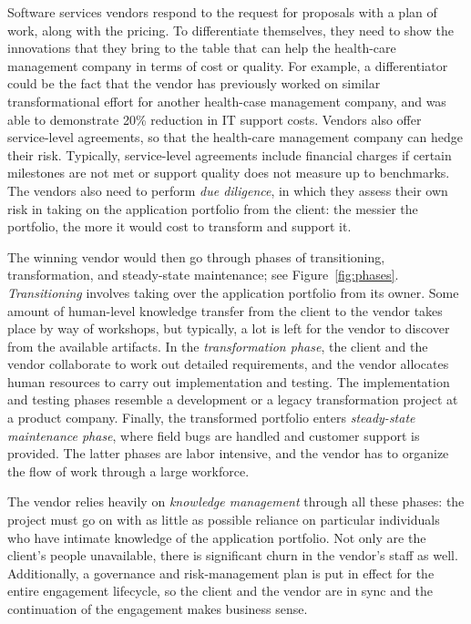 Software services vendors respond to the request for proposals with a plan of
work, along with the pricing. To differentiate themselves, they need to show the
innovations that they bring to the table that can help the health-care
management company in terms of cost or quality. For example, a differentiator
could be the fact that the vendor has previously worked on similar
transformational effort for another health-case management company, and was able
to demonstrate 20\% reduction in IT support costs.  Vendors also offer
service-level agreements, so that the health-care management company can hedge
their risk.  Typically, service-level agreements include financial charges if
certain milestones are not met or support quality does not measure up to
benchmarks. The vendors also need to perform \textit{due diligence}, in which
they assess their own risk in taking on the application portfolio from the
client: the messier the portfolio, the more it would cost to transform and
support it.

The winning vendor would then go through phases of transitioning,
transformation, and steady-state maintenance; see
Figure~\ref{fig:phases}. \textit{Transitioning} involves taking over the
application portfolio from its owner. Some amount of human-level knowledge
transfer from the client to the vendor takes place by way of workshops, but
typically, a lot is left for the vendor to discover from the available
artifacts. In the \textit{transformation phase}, the client and the vendor
collaborate to work out detailed requirements, and the vendor allocates human
resources to carry out implementation and testing. The implementation and
testing phases resemble a development or a legacy transformation project at a
product company.  Finally, the transformed portfolio enters \textit{steady-state
  maintenance phase}, where field bugs are handled and customer support is
provided.  The latter phases are labor intensive, and the vendor has to organize
the flow of work through a large workforce.

The vendor relies heavily on \textit{knowledge management} through all these
phases: the project must go on with as little as possible reliance on particular
individuals who have intimate knowledge of the application portfolio. Not only
are the client's people unavailable, there is significant churn in the vendor's
staff as well.  Additionally, a governance and risk-management plan is put in
effect for the entire engagement lifecycle, so the client and the vendor are in
sync and the continuation of the engagement makes business sense.

